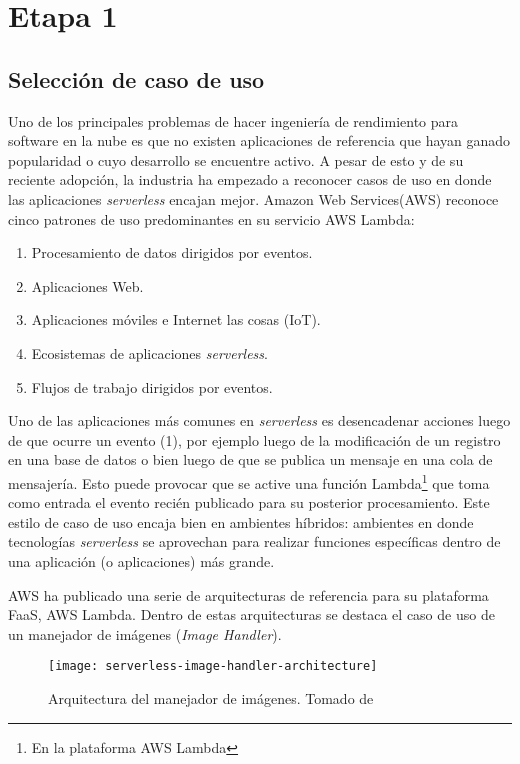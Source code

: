 \section{Etapa 1}
\subsection{Selección de caso de uso}
Uno de los principales problemas de hacer ingeniería de rendimiento para software en la nube es que no existen aplicaciones de referencia que hayan ganado popularidad o cuyo desarrollo se encuentre activo. A pesar de esto y de su reciente adopción, la industria ha empezado a reconocer casos de uso en donde las aplicaciones \emph{serverless} encajan mejor. Amazon Web Services(AWS)\cite{serverless-architecture-patterns} reconoce cinco patrones de uso predominantes en su servicio AWS Lambda:
\begin{enumerate}
    \item Procesamiento de datos dirigidos por eventos.
    \item Aplicaciones Web.
    \item Aplicaciones móviles e Internet las cosas (IoT).
    \item Ecosistemas de aplicaciones \emph{serverless}.
    \item Flujos de trabajo dirigidos por eventos.
\end{enumerate}
 
Uno de las aplicaciones más comunes en \emph{serverless} es desencadenar acciones luego de que ocurre un evento (1), por ejemplo luego de la modificación de un registro en una base de datos o bien luego de que se publica un mensaje en una cola de mensajería. Esto puede provocar que se active una función Lambda\footnote{En la plataforma AWS Lambda } que toma como entrada el evento recién publicado para su posterior procesamiento. Este estilo de caso de uso encaja bien en ambientes híbridos: ambientes en donde tecnologías \emph{serverless} se aprovechan para realizar funciones específicas dentro de una aplicación (o aplicaciones) más grande.

AWS ha publicado una serie de arquitecturas de referencia\cite{aws-lambda-ref-arch} para su plataforma FaaS, AWS Lambda. Dentro de estas arquitecturas se destaca el caso de uso de un manejador de imágenes (\emph{Image Handler})\cite{aws-lambda-image-handler}. 

\begin{figure}[h]
  \centering
  \texttt{[image: serverless-image-handler-architecture]}
  \caption[Arquitectura del manejador de imágenes]{Arquitectura del manejador de imágenes. Tomado de \protect\cite{aws-lambda-image-handler}}
  \label{fig:serverless-image-handler-architecture}
\end{figure}

